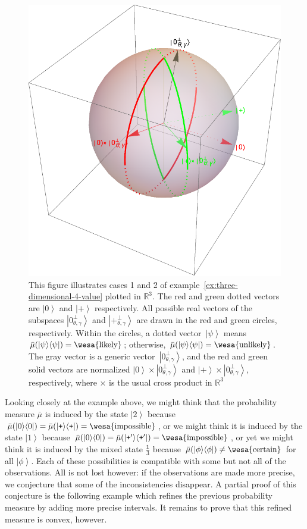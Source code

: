 \documentclass{article}
\theoremstyle{remark}
\newcommand{\imposs}{{\mbox{\wesa{impossible}}}}
\newcommand{\likely}{{\mbox{\wesa{likely}}}}
\newcommand{\unlikely}{{\mbox{\wesa{unlikely}}}}
\newcommand{\necess}{{\mbox{\wesa{certain}}}}
\newcommand{\ket}[1]{{\left\vert{#1}\right\rangle}}
\newcommand{\op}[2]{\ensuremath{\left\vert{#1}\middle\rangle\middle\langle{#2}\right\vert}}
\newcommand{\proj}[1]{\op{#1}{#1}}
\newcommand{\ps}{\texttt{+}}
\begin{document}
\begin{figure}
\begin{center}
\includegraphics[scale=0.38]{measure4.pdf}
\end{center}
\caption{\label{fig:three-dimensional-4-value}This figure illustrates
  cases 1 and 2 of example~\ref{ex:three-dimensional-4-value} plotted
  in $\mathbb{R}^{3}$. The red and green dotted vectors are $\ket{0}$
  and $\ket{\ps}$ respectively.  All possible real vectors of the subspaces
  $\ket{0_{\theta,\gamma}^{\perp}}$ and
  $\ket{\ps_{\theta,\gamma}^{\perp}}$ are drawn in the red and green
  circles, respectively. Within the circles, a dotted
  vector~$\ket{\psi}$ means $\bar{\mu}(\proj{\psi})=\likely$;
  otherwise, $\bar{\mu}(\proj{\psi})=\unlikely$. The gray vector is a
  generic vector~$\ket{0_{\theta,\gamma}^{\perp}}$, and the red and
  green solid vectors are normalized
  $\ket{0}\times\ket{0_{\theta,\gamma}^{\perp}}$ and
  $\ket{\ps}\times\ket{0_{\theta,\gamma}^{\perp}}$, respectively, where
  $\times$ is the usual cross product in $\mathbb{R}^{3}$}
\end{figure}

Looking closely at the example above, we might think that the
probability measure $\bar{\mu}$ is induced by the state $\ket{2}$
because $\bar{\mu}(\proj{0})=\bar{\mu}(\proj{\ps})=\imposs$, or we
might think it is induced by the state $\ket{1}$ because
$\bar{\mu}(\proj{0})=\bar{\mu}(\proj{\ps'})=\imposs$, or yet we might
think it is induced by the mixed state $\frac{\mathbb{1}}{3}$ because
$\bar{\mu}(\proj{\phi})\ne\necess$ for all $\ket{\phi}$. Each of these
possibilities is compatible with some but not all of the
observations. All is not lost however: if the observations are made
more precise, we conjecture that some of the inconsistencies
disappear. A partial proof of this conjecture is the following example
which refines the previous probability measure by adding more precise
intervals. It remains to prove that this refined measure is convex,
however. 
\end{document}
